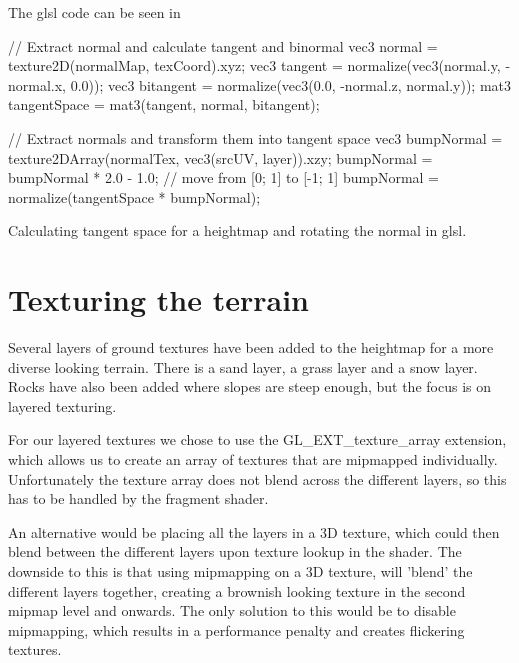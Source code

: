 The glsl code can be seen in 

\begin{listing}
\label{lst:bumpmapping}
\centering
\begin{cppcode}
  // Extract normal and calculate tangent and binormal
  vec3 normal = texture2D(normalMap, texCoord).xyz;
  vec3 tangent = normalize(vec3(normal.y, -normal.x, 0.0));
  vec3 bitangent = normalize(vec3(0.0, -normal.z, normal.y));
  mat3 tangentSpace = mat3(tangent, normal, bitangent);

  // Extract normals and transform them into tangent space
  vec3 bumpNormal = texture2DArray(normalTex, vec3(srcUV, layer)).xzy;
  bumpNormal = bumpNormal * 2.0 - 1.0; // move from [0; 1] to [-1; 1]
  bumpNormal = normalize(tangentSpace * bumpNormal);
\end{cppcode}
\caption{Calculating tangent space for a heightmap and rotating the normal in glsl.}
\end{listing}


\section{Texturing the terrain}

Several layers of ground textures have been added to the heightmap for
a more diverse looking terrain. There is a sand layer, a grass layer
and a snow layer. Rocks have also been added where slopes are steep
enough, but the focus is on layered texturing.


For our layered textures we chose to use the GL\_EXT\_texture\_array
extension, which allows us to create an array of textures that are
mipmapped individually. Unfortunately the texture array does not blend
across the different layers, so this has to be handled by the fragment
shader.


An alternative would be placing all the layers in a 3D texture, which
could then blend between the different layers upon texture lookup in
the shader. The downside to this is that using mipmapping on a 3D
texture, will 'blend' the different layers together, creating a
brownish looking texture in the second mipmap level and onwards. The
only solution to this would be to disable mipmapping, which results in
a performance penalty and creates flickering textures.

